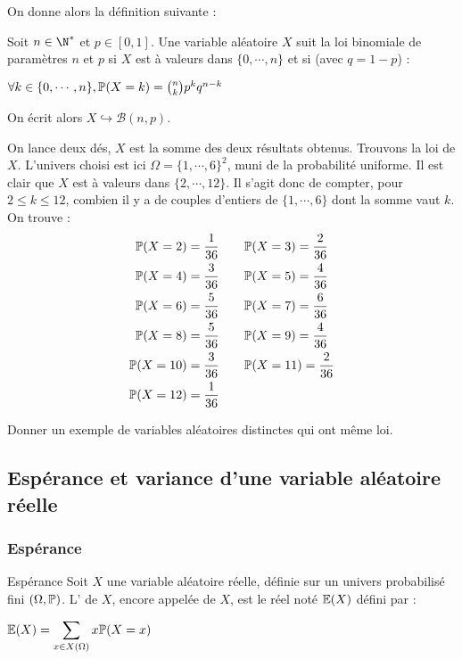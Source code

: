 \documentclass[12pt,a4paper]{report}
\begin{document}
On donne alors la définition suivante :
\begin{definition}{}{}
Soit $n \in \N^*$ et $p \in [0,1]$. Une variable aléatoire $X$ suit la loi binomiale de paramètres $n$ et $p$ si $X$ est à valeurs dans $\{0,\cdots,n\}$ et si (avec $q = 1 - p$) :
\begin{center}
$\forall k \in \{0,\cdots,n\}, \mathbb{P}(X=k) = \binom{n}{k}p^kq^{n-k}$
\end{center}
On écrit alors $X \hookrightarrow \mathcal{B}(n,p)$.
\end{definition}

\begin{exemple}{}
On lance deux dés, $X$ est la somme des deux résultats obtenus. Trouvons la loi de $X$. L'univers choisi est ici $\Omega = \{1,\cdots,6\}^2$, muni de la probabilité uniforme. Il est clair que $X$ est à valeurs dans $\{2,\cdots,12\}$. Il s'agit donc de compter, pour $2 \le k \le 12$, combien il y a de couples d'entiers de $\{1,\cdots,6\}$ dont la somme vaut $k$. On trouve :
\begin{align*}
\mathbb{P}(X=2) = \dfrac{1}{36} \quad & \quad \mathbb{P}(X=3) = \dfrac{2}{36} \\
\mathbb{P}(X=4) = \dfrac{3}{36} \quad & \quad \mathbb{P}(X=5) = \dfrac{4}{36} \\
\mathbb{P}(X=6) = \dfrac{5}{36} \quad & \quad \mathbb{P}(X=7) = \dfrac{6}{36} \\
\mathbb{P}(X=8) = \dfrac{5}{36} \quad & \quad \mathbb{P}(X=9) = \dfrac{4}{36} \\
\mathbb{P}(X=10) = \dfrac{3}{36} \quad & \quad \mathbb{P}(X=11) = \dfrac{2}{36} \\
\mathbb{P}(X=12) = \dfrac{1}{36} \quad & {}
\end{align*}
\end{exemple}

\begin{exemple}[Exercice 9]{}
Donner un exemple de variables aléatoires distinctes qui ont même loi.
\end{exemple}

\subsection{Espérance et variance d'une variable aléatoire réelle}

\subsubsection{Espérance}

\begin{definition}{Espérance}{}
Soit $X$ une variable aléatoire réelle, définie sur un univers probabilisé fini $(\Omega, \mathbb{P})$. L' de $X$, encore appelée  de $X$, est le réel noté $\mathbb{E}(X)$ défini par : 
\begin{center}
$\mathbb{E}(X) = \displaystyle \sum_{x \in X(\Omega)} x\mathbb{P}(X=x)$
\end{center}
\end{definition}
\end{document}
